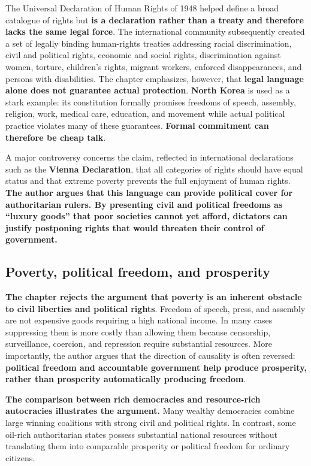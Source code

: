The {Universal Declaration of Human Rights} of 1948 helped define a broad catalogue of rights but \textbf{is a declaration rather than a treaty and therefore lacks the same legal force}. The international community subsequently created a set of legally binding human-rights treaties addressing racial discrimination, civil and political rights, economic and social rights, discrimination against women, torture, children's rights, migrant workers, enforced disappearances, and persons with disabilities. The chapter emphasizes, however, that \textbf{legal language alone does not guarantee actual protection}. \textbf{North Korea} is used as a stark example: its constitution formally promises freedoms of speech, assembly, religion, work, medical care, education, and movement while actual political practice violates many of these guarantees. \textbf{Formal commitment can therefore be cheap talk}.

A major controversy concerns the claim, reflected in international declarations such as the \textbf{Vienna Declaration}, that all categories of rights should have equal status and that extreme poverty prevents the full enjoyment of human rights. \textbf{The author argues that this language can provide political cover for authoritarian rulers. By presenting civil and political freedoms as ``luxury goods'' that poor societies cannot yet afford, dictators can justify postponing rights that would threaten their control of government.}

\subsection{Poverty, political freedom, and prosperity}

\textbf{The chapter rejects the argument that poverty is an inherent obstacle to civil liberties and political rights}. Freedom of speech, press, and assembly are not expensive goods requiring a high national income. In many cases suppressing them is more costly than allowing them because censorship, surveillance, coercion, and repression require substantial resources. More importantly, the author argues that the direction of causality is often reversed: \textbf{political freedom and accountable government help produce prosperity, rather than prosperity automatically producing freedom}.

\textbf{The comparison between rich democracies and resource-rich autocracies illustrates the argument.} Many wealthy democracies combine large winning coalitions with strong civil and political rights. In contrast, some oil-rich authoritarian states possess substantial national resources without translating them into comparable prosperity or political freedom for ordinary citizens.

